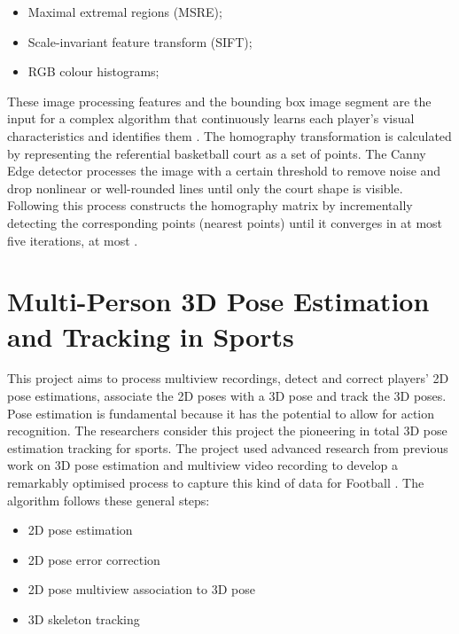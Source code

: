 \documentclass[
    11pt,
    oneside
]{report}
\begin{document}
\begin{itemize}
    \item Maximal extremal regions (MSRE);
    \item Scale-invariant feature transform (SIFT);
    \item RGB colour histograms;
\end{itemize}


These image processing features and the bounding box image segment are the input for a complex algorithm that continuously learns each player's visual characteristics and identifies them \cite{learn_track_id}.
The homography transformation is calculated by representing the referential basketball court as a set of points. The Canny Edge detector processes the image with a certain threshold to remove noise and drop nonlinear or well-rounded lines until only the court shape is visible. Following this process constructs the homography matrix by incrementally detecting the corresponding points (nearest points) until it converges in at most five iterations, at most \cite{learn_track_id}.

\section{Multi-Person 3D Pose Estimation and Tracking in Sports}






This project aims to process multiview recordings, detect and correct players' 2D pose estimations, associate the 2D poses with a 3D pose and track the 3D poses. Pose estimation is fundamental because it has the potential to allow for action recognition. The researchers consider this project the pioneering in total 3D pose estimation tracking for sports. The project used advanced research from previous work on 3D pose estimation and multiview video recording to develop a remarkably optimised process to capture this kind of data for Football \cite{cvpr_2019}. The algorithm follows these general steps:

\begin{itemize}
    \item 2D pose estimation
    \item 2D pose error correction
    \item 2D pose multiview association to 3D pose
    \item 3D skeleton tracking
\end{itemize}
\end{document}
